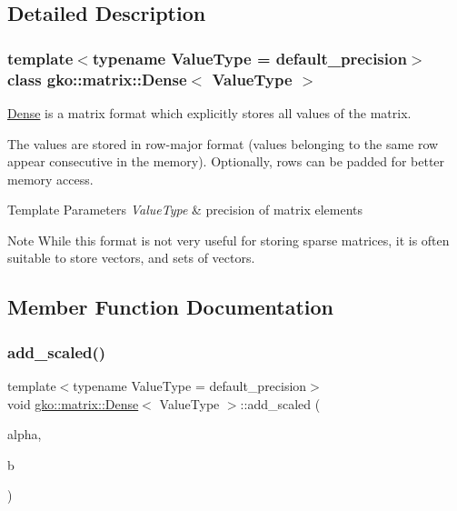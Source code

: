 \subsection{Detailed Description}
\subsubsection*{template$<$typename Value\+Type = default\+\_\+precision$>$\newline
class gko\+::matrix\+::\+Dense$<$ Value\+Type $>$}

\hyperlink{classgko_1_1matrix_1_1Dense}{Dense} is a matrix format which explicitly stores all values of the matrix. 

The values are stored in row-\/major format (values belonging to the same row appear consecutive in the memory). Optionally, rows can be padded for better memory access.


\begin{DoxyTemplParams}{Template Parameters}
{\em Value\+Type} & precision of matrix elements\\
\hline
\end{DoxyTemplParams}
\begin{DoxyNote}{Note}
While this format is not very useful for storing sparse matrices, it is often suitable to store vectors, and sets of vectors. 
\end{DoxyNote}


\subsection{Member Function Documentation}
\mbox{\label{classgko_1_1matrix_1_1Dense_ae6c4c15972b76bf7d8f6d50a96abda8d}} 
\subsubsection{\texorpdfstring{add\+\_\+scaled()}{add\_scaled()}}
{\footnotesize\ttfamily template$<$typename Value\+Type = default\+\_\+precision$>$ \\
void \hyperlink{classgko_1_1matrix_1_1Dense}{gko\+::matrix\+::\+Dense}$<$ Value\+Type $>$\+::add\+\_\+scaled (\begin{DoxyParamCaption}\item[{const \hyperlink{classgko_1_1LinOp}{Lin\+Op} $\ast$}]{alpha,  }\item[{const \hyperlink{classgko_1_1LinOp}{Lin\+Op} $\ast$}]{b }\end{DoxyParamCaption})}



